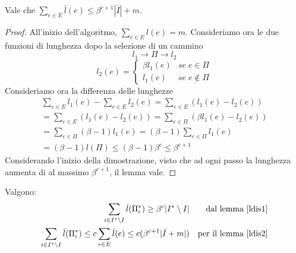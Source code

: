 \begin{lemma}
    \label{ldis2}
    Vale che $\sum_{e \in E}\bar{l}(e) \leq \beta^{c+1}|\bar{I}| + m$.
\end{lemma}
\begin{proof}
    All'inizio dell'algoritmo, $\sum_{e \in E} l(e) = m$.
    Consideriamo ora le due funzioni di lunghezza dopo la selezione di un cammino
    $$l_1 \longrightarrow \Pi \longrightarrow l_2$$
    \[ 
        l_2(e) = 
        \begin{cases}
        \beta l_1(e) & \mathit{se}\;e \in \Pi\\
        l_1(e) & \mathit{se}\;e \notin \Pi
     \end{cases}
    \]
    Consideriamo ora la differenza delle lunghezze
    \begin{equation}
        \begin{aligned}
            \sum_{e \in E} l_1(e) - \sum_{e \in E} l_2(e) = \sum_{e \in E} (l_1(e) - l_2(e))\\
            = \sum_{e \in E} (l_1(e) - l_2(e)) = \sum_{e \in \Pi} (\beta l_1(e) - l_2(e))\\
            = \sum_{e \in \Pi} (\beta -1)l_1(e) = (\beta -1) \sum_{e \in \Pi} l_1(e)\\
            = (\beta -1)l(\Pi) \leq (\beta -1)\beta^c \leq \beta^{c+1}
        \end{aligned}
    \end{equation}
    Considerando l'inizio della dimostrazione, visto che ad ogni passo la lunghezza aumenta di al 
    massimo $\beta^{c+1}$, il lemma vale.
\end{proof}
\begin{remark}
    \label{oss3dis}
    Valgono:
    \begin{equation}
        \begin{aligned}
            \sum_{i \in I^* \setminus I} \bar{l}(\Pi_i^*) \geq \beta^c|I^* \setminus I| && \text{dal lemma \ref{ldis1}}\\
            \sum_{i \in I^* \setminus I} \bar{l}(\Pi_i^*) \leq c\sum_{e \in E} \bar{l}(e) \leq c(\beta ^{c+1}|\bar{I} + m|)
            && \text{per il lemma \ref{ldis2}}
        \end{aligned}
    \end{equation}
\end{remark}

